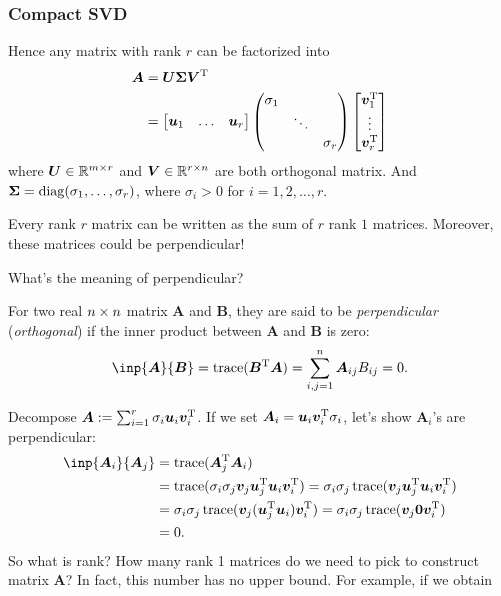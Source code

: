 \subsubsection{Compact SVD}
Hence any matrix with rank $r$ can be factorized into
\begin{align*}
\bm A&=\bm U\bm\Sigma\bm V^{\mathrm T}\\
&=\begin{bmatrix}
\bm u_1&\dots&\bm u_r
\end{bmatrix}\begin{pmatrix}
\sigma_1&&\\&\ddots&\\&&\sigma_r
\end{pmatrix}\begin{bmatrix}
\bm v_1^{\mathrm T}\\\vdots\\\bm v_r^{\mathrm T}
\end{bmatrix}
\end{align*}
where $\bm U\in\mathbb{R}^{m\times r}$ and $\bm V\in\mathbb{R}^{r\times n}$ are both orthogonal matrix. And $\bm\Sigma=\operatorname{diag}(\sigma_1,\dots,\sigma_r)$, where $\sigma_i>0$ for $i=1,2,\dots,r$.
\begin{corollary}
Every rank $r$ matrix can be written as the sum of $r$ rank $1$ matrices. Moreover, these matrices could be perpendicular!
\end{corollary}
What's the meaning of perpendicular?
\begin{definition}
For two real $n\times n$ matrix $\bm A$ and $\bm B$, they are said to be \emph{perpendicular} (\emph{orthogonal}) if the inner product between $\bm A$ and $\bm B$ is zero:
\[
\inp{\bm A}{\bm B}=\trace(\bm B\trans\bm A)=\sum_{i,j=1}^{n}\bm A_{ij}B_{ij}=0.
\]
\end{definition}
Decompose $\bm A:=\sum_{i=1}^{r}\sigma_i\bm u_i\bm v_i^{\mathrm T}$. If we set $\bm A_i=\bm u_i\bm v_i^{\mathrm T}\sigma_i$, let's show $\bm A_i$'s are perpendicular:
\begin{align*}
\inp{\bm A_i}{\bm A_j}&=\trace(\bm A_j\trans\bm A_i)\\
&=\trace(\sigma_i\sigma_j\bm v_j\bm u_j\trans\bm u_i\bm v_i\trans)=\sigma_i\sigma_j\trace(\bm v_j\bm u_j\trans\bm u_i\bm v_i\trans)\\
&=\sigma_i\sigma_j\trace(\bm v_j(\bm u_j\trans\bm u_i)\bm v_i\trans)=\sigma_i\sigma_j\trace(\bm v_j\bm 0\bm v_i\trans)\\
&=0.
\end{align*}
So what is rank? How many rank 1 matrices do we need to pick to construct matrix $\bm A$? In fact, this number has no upper bound. For example, if we obtain
